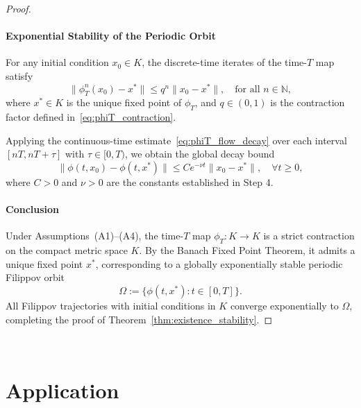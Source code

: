 \documentclass[11pt]{article}
\begin{document}
\begin{proof}
\paragraph{Exponential Stability of the Periodic Orbit}

For any initial condition \( x_0 \in K \), the discrete-time iterates of the time-\( T \) map satisfy
\begin{equation} \label{eq:discrete_decay}
	\|\phi_T^n(x_0) - x^*\| \leq q^n \|x_0 - x^*\|, \quad \text{for all } n \in \mathbb{N},
\end{equation}
where \( x^* \in K \) is the unique fixed point of \( \phi_T \), and \( q \in (0,1) \) is the contraction factor defined in~\eqref{eq:phiT_contraction}.

Applying the continuous-time estimate~\eqref{eq:phiT_flow_decay} over each interval \( [nT, nT + \tau] \) with \( \tau \in [0, T) \), we obtain the global decay bound
\begin{equation} \label{eq:continuous_decay}
	\|\phi(t, x_0) - \phi(t, x^*)\| \leq C e^{-\nu t} \|x_0 - x^*\|, \quad \forall t \geq 0,
\end{equation}
where \( C > 0 \) and \( \nu > 0 \) are the constants established in Step 4.

\paragraph{Conclusion}

Under Assumptions~(A1)--(A4), the time-\( T \) map \( \phi_T \colon K \to K \) is a strict contraction on the compact metric space \( K \). By the Banach Fixed Point Theorem, it admits a unique fixed point \( x^* \), corresponding to a globally exponentially stable periodic Filippov orbit
\[
\Omega := \{ \phi(t, x^*) : t \in [0,T] \}.
\]
All Filippov trajectories with initial conditions in \( K \) converge exponentially to \( \Omega \), completing the proof of Theorem~\ref{thm:existence_stability}.

\end{proof}


\


\section{Application}
\label{sec:application}
\end{document}
